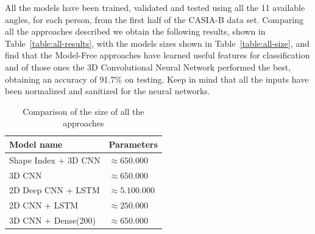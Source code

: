 \documentclass[12pt]{article}
\theoremstyle{definition}
\begin{document}
	All the models have been trained, validated and tested using all the 11 available angles, for each person, from the first half of the CASIA-B data set. Comparing all the approaches described we obtain the following results, shown in Table~\ref{table:all-results}, with the models sizes shown in Table~\ref{table:all-size}, and find that the Model-Free approaches have learned useful features for classification and of those ones the 3D Convolutional Neural Network performed the best, obtaining an accuracy of 91.7\% on testing. Keep in mind that all the inputs have been normalized and sanitized for the neural networks.

	\begin{table}[h]
		\centering
		\renewcommand{\arraystretch}{1.5}

		\caption{Comparison of the size of all the approaches}
		\label{table:all-zise}

		\begin{tabular}{ll}
			\textbf{Model name}  &\textbf{Parameters} \\ \hline
			Shape Index + 3D CNN & $\approx 650.000$   \\ \hline
			3D CNN               & $\approx 650.000$   \\ \hline
			2D Deep CNN + LSTM   & $\approx 5.100.000$ \\ \hline
			2D CNN + LSTM        & $\approx 250.000$   \\ \hline
			3D CNN + Dense(200)  & $\approx 650.000$   \\
		\end{tabular}
	\end{table}
\end{document}
